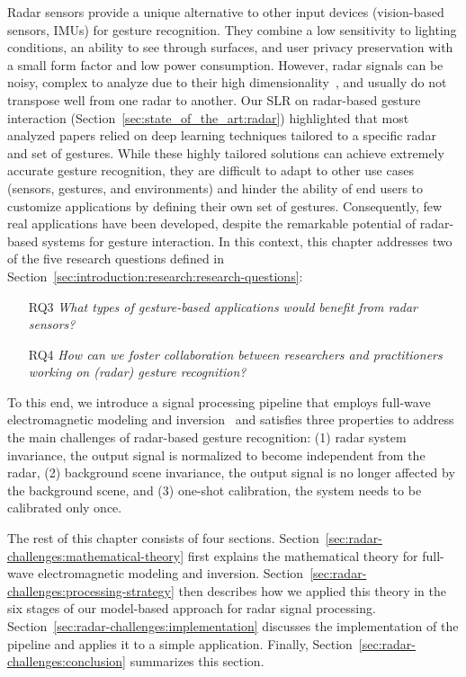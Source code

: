 Radar sensors provide a unique alternative to other input devices (\eg vision-based sensors, IMUs) for gesture recognition. They combine a low sensitivity to lighting conditions, an ability to see through surfaces, and user privacy preservation with a small form factor and low power consumption. However, radar signals can be noisy, complex to analyze due to their high dimensionality~\cite{vanderMaaten:2009}, and usually do not transpose well from one radar to another.
%
Our SLR on radar-based gesture interaction (Section~\ref{sec:state_of_the_art:radar}) highlighted that most analyzed papers relied on deep learning techniques tailored to a specific radar and set of gestures. 
%
While these highly tailored solutions can achieve extremely accurate gesture recognition, they are difficult to adapt to other use cases (\eg sensors, gestures, and environments) and hinder the ability of end users to customize applications by defining their own set of gestures.
%
Consequently, few real applications have been developed, despite the remarkable potential of radar-based systems for gesture interaction.
%
In this context, this chapter addresses two of the five research questions defined in Section~\ref{sec:introduction:research:research-questions}: 
\begin{itemize}
    \item [RQ3] \textit{What types of gesture-based applications would benefit from radar sensors?}
    \item [RQ4] \textit{How can we foster collaboration between researchers and practitioners working on (radar) gesture recognition?}
\end{itemize}
To this end, we introduce a signal processing pipeline that employs full-wave electromagnetic modeling and inversion~\cite{Lambot:2004,Lambot:2014} and satisfies three properties to address the main challenges of radar-based gesture recognition: (1) radar system invariance, \ie the output signal is normalized to become independent from the radar, (2) background scene invariance, \ie the output signal is no longer affected by the background scene, and (3) one-shot calibration, \ie the system needs to be calibrated only once.

The rest of this chapter consists of four sections.
Section~\ref{sec:radar-challenges:mathematical-theory} first explains the mathematical theory for full-wave electromagnetic modeling and inversion.
Section~\ref{sec:radar-challenges:processing-strategy} then describes how we applied this theory in the six stages of our model-based approach for radar signal processing. 
Section~\ref{sec:radar-challenges:implementation} discusses the implementation of the pipeline and applies it to a simple application.
Finally, Section~\ref{sec:radar-challenges:conclusion} summarizes this section.

